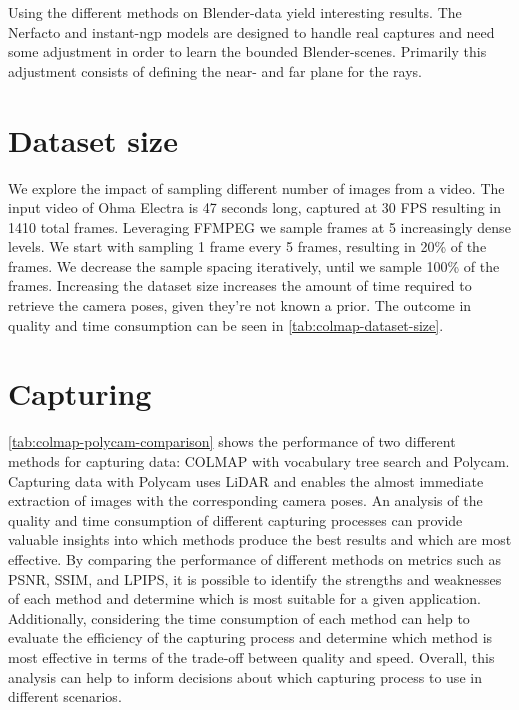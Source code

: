 Using the different methods on Blender-data yield interesting results. The Nerfacto and instant-ngp models are designed to handle real captures and need some adjustment in order to learn the bounded Blender-scenes. Primarily this adjustment consists of defining the near- and far plane for the rays.



\section{Dataset size}
We explore the impact of sampling different number of images from a video. The input video of Ohma Electra \cite{data:object-unbounded-ohma} is 47 seconds long, captured at 30 FPS resulting in 1410 total frames. Leveraging FFMPEG we sample frames at 5 increasingly dense levels. We start with sampling 1 frame every 5 frames, resulting in 20\% of the frames. We decrease the sample spacing iteratively, until we sample 100\% of the frames. Increasing the dataset size increases the amount of time required to retrieve the camera poses, given they're not known a prior. The outcome in quality and time consumption can be seen in \autoref{tab:colmap-dataset-size}.




\section{Capturing}
\autoref{tab:colmap-polycam-comparison} shows the performance of two different methods for capturing data: COLMAP with vocabulary tree search and Polycam. Capturing data with Polycam uses LiDAR and enables the almost immediate extraction of images with the corresponding camera poses. An analysis of the quality and time consumption of different capturing processes can provide valuable insights into which methods produce the best results and which are most effective. By comparing the performance of different methods on metrics such as PSNR, SSIM, and LPIPS, it is possible to identify the strengths and weaknesses of each method and determine which is most suitable for a given application. Additionally, considering the time consumption of each method can help to evaluate the efficiency of the capturing process and determine which method is most effective in terms of the trade-off between quality and speed. Overall, this analysis can help to inform decisions about which capturing process to use in different scenarios.

